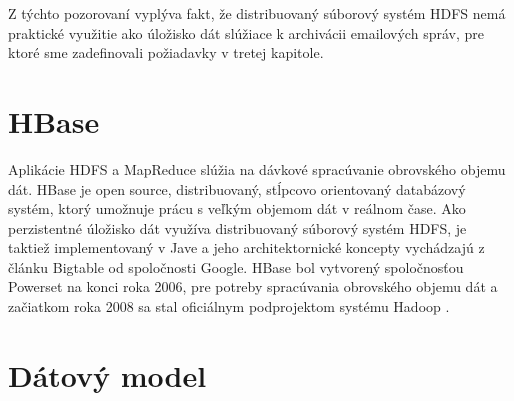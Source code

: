 \documentclass[11pt,twoside,a4paper]{book}
\begin{document}
Z týchto pozorovaní vyplýva fakt, že distribuovaný súborový systém HDFS nemá praktické využitie ako úložisko dát slúžiace k archivácii emailových správ, pre ktoré sme zadefinovali požiadavky v tretej kapitole. %
% 
% 



\section*{HBase}


Aplikácie HDFS a MapReduce slúžia na dávkové spracúvanie obrovského objemu dát. HBase je open source, distribuovaný, stĺpcovo orientovaný databázový systém, ktorý umožnuje prácu s veľkým objemom dát v reálnom čase. Ako perzistentné úložisko dát využíva distribuovaný súborový systém HDFS, je taktiež implementovaný v Jave a jeho architektornické koncepty vychádzajú z článku Bigtable od spoločnosti Google. HBase bol vytvorený spoločnosťou Powerset na konci roka 2006, pre potreby spracúvania obrovského objemu dát a začiatkom roka 2008 sa stal oficiálnym podprojektom systému Hadoop \cite{White:2009:HDG:1717298}.

\section{Dátový model}
\end{document}
